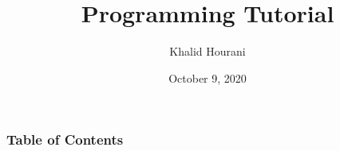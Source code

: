 \documentclass{beamer}
\title{Programming Tutorial}
\author{Khalid Hourani}
\date{October 9, 2020}
\institute{University of Houston}
\begin{document}
\frame{\titlepage}

\begin{frame}
    \frametitle{Table of Contents}
    \tableofcontents
\end{frame}



\end{document}
